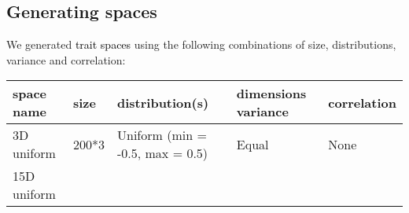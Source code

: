 \documentclass[]{article}
\begin{document}
\subsection{Generating spaces}\label{generating-spaces}

We generated \textcolor{black}{trait spaces} using the
following combinations of size, distributions, variance and correlation:

\renewcommand\baselinestretch{1}\selectfont

\begin{longtable}[]{@{}lllll@{}}
\toprule
\begin{minipage}[b]{0.12\columnwidth}\raggedright\strut
space name\strut
\end{minipage} & \begin{minipage}[b]{0.12333\columnwidth}\raggedright\strut
size\strut
\end{minipage} & \begin{minipage}[b]{0.31\columnwidth}\raggedright\strut
distribution(s)\strut
\end{minipage} & \begin{minipage}[b]{0.21\columnwidth}\raggedright\strut
dimensions variance\strut
\end{minipage} & \begin{minipage}[b]{0.13\columnwidth}\raggedright\strut
correlation\strut
\end{minipage}\tabularnewline
\midrule
\endhead
\begin{minipage}[t]{0.12\columnwidth}\raggedright\strut
3D uniform\strut
\end{minipage} & \begin{minipage}[t]{0.12333\columnwidth}\raggedright\strut
200*3\strut
\end{minipage} & \begin{minipage}[t]{0.31\columnwidth}\raggedright\strut
Uniform (min = -0.5, max = 0.5)\strut
\end{minipage} & \begin{minipage}[t]{0.21\columnwidth}\raggedright\strut
Equal\strut
\end{minipage} & \begin{minipage}[t]{0.13\columnwidth}\raggedright\strut
None\strut
\end{minipage}\tabularnewline
\begin{minipage}[t]{0.12\columnwidth}\raggedright\strut
15D uniform\strut
\end{minipage} & \begin{minipage}[t]{0.12333\columnwidth}\raggedright\strut

\end{minipage}
\end{longtable}
\end{document}
